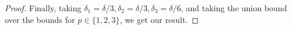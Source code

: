 \begin{proof}

Finally, taking $\delta_1 = \delta/3, \delta_2 = \delta/3, \delta_3
= \delta/6$, and taking the union bound over the bounds for $p \in
\{1,2,3\}$, we get our result.
\end{proof}

